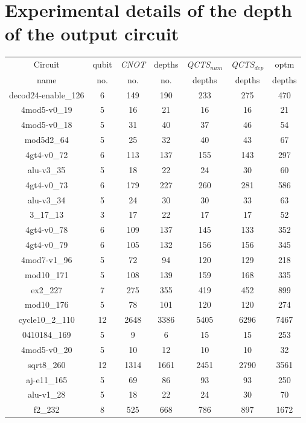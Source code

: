 \documentclass[runningheads]{llncs}
\begin{document}
\section{Experimental details of the depth of the output circuit}
					\begin{table}[H]
						\begin{center}  
						\begin{tabular}{|c|c|c|c|c|c|c|}
						\hline
						Circuit &  qubit  & \textit{CNOT} &depths &\textit{QCTS$_{num}$}& \textit{QCTS$_{dep}$}  & optm 	  	\\
						 name	&   no. 	&	no. & no. & depths&  depths &  depths 	\\
						\hline
						decod24-enable\_126 & 6 & 149 & 190 & 233 & 275 & 470 \\
4mod5-v0\_19 & 5 & 16 & 21 & 16 & 16 & 21 \\
4mod5-v0\_18 & 5 & 31 & 40 & 37 & 46 & 54 \\
mod5d2\_64 & 5 & 25 & 32 & 40 & 43 & 67 \\
4gt4-v0\_72 & 6 & 113 & 137 & 155 & 143 & 297 \\
alu-v3\_35 & 5 & 18 & 22 & 24 & 30 & 60 \\
4gt4-v0\_73 & 6 & 179 & 227 & 260 & 281 & 586 \\
alu-v3\_34 & 5 & 24 & 30 & 30 & 33 & 63 \\
3\_17\_13 & 3 & 17 & 22 & 17 & 17 & 52 \\
4gt4-v0\_78 & 6 & 109 & 137 & 145 & 133 & 352 \\
4gt4-v0\_79 & 6 & 105 & 132 & 156 & 156 & 345 \\
4mod7-v1\_96 & 5 & 72 & 94 & 120 & 129 & 218 \\
mod10\_171 & 5 & 108 & 139 & 159 & 168 & 335 \\
ex2\_227 & 7 & 275 & 355 & 419 & 452 & 899 \\
mod10\_176 & 5 & 78 & 101 & 120 & 120 & 274 \\
cycle10\_2\_110 & 12 & 2648 & 3386 & 5405 & 6296 & 7467 \\
0410184\_169 & 5 & 9 & 6 & 15 & 15 & 253 \\
4mod5-v0\_20 & 5 & 10 & 12 & 10 & 10 & 32 \\
sqrt8\_260 & 12 & 1314 & 1661 & 2451 & 2790 & 3561 \\
aj-e11\_165 & 5 & 69 & 86 & 93 & 93 & 250 \\
alu-v1\_28 & 5 & 18 & 22 & 24 & 30 & 70 \\
f2\_232 & 8 & 525 & 668 & 786 & 897 & 1672 \\

\end{tabular}
\end{center}
\end{table}
\end{document}
